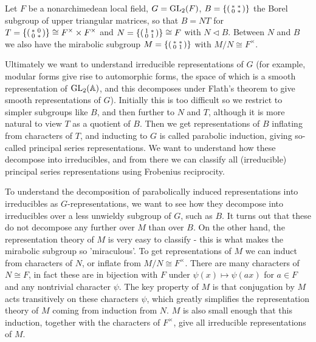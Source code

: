 

Let $F$ be a nonarchimedean local field, $G=\mathrm{GL}_2(F)$, $B=\{\begin{psmallmatrix} *&*\\0&*\end{psmallmatrix}\}$ the Borel subgroup of upper triangular matrices, so that $B=NT$ for $T=\{\begin{psmallmatrix}
    *&0\\0&*
\end{psmallmatrix}\} \cong F^\times \times F^\times$ and $N=\{\begin{psmallmatrix}
    1&*\\0&1
\end{psmallmatrix}\}\cong F$ with $N \lhd B$. Between $N$ and $B$ we also have the mirabolic subgroup $M=\{\begin{psmallmatrix}
    *&*\\0&1
\end{psmallmatrix}\}$ with $M/N \cong F^\times$.

Ultimately we want to understand irreducible representations of $G$ (for example, modular forms give rise to automorphic forms, the space of which is a smooth representation of $\mathrm{GL}_2(\mathbb{A})$, and this decomposes under Flath's theorem to give smooth representations of $G$). Initially this is too difficult so we restrict to simpler subgroups like $B$, and then further to $N$ and $T$, although it is more natural to view $T$ as a quotient of $B$. Then we get representations of $B$ inflating from characters of $T$, and inducting to $G$ is called parabolic induction, giving so-called principal series representations. We want to understand how these decompose into irreducibles, and from there we can classify all (irreducible) principal series representations using Frobenius reciprocity.

To understand the decomposition of parabolically induced representations into irreducibles as $G$-representations, we want to see how they decompose into irreducibles over a less unwieldy subgroup of $G$, such as $B$. It turns out that these do not decompose any further over $M$ than over $B$. On the other hand, the representation theory of $M$ is very easy to classify - this is what makes the mirabolic subgroup so 'miraculous'. To get representations of $M$ we can induct from characters of $N$, or inflate from $M/N\cong F^\times$. There are many characters of $N\cong F$, in fact these are in bijection with $F$ under $\psi(x) \mapsto \psi(ax)$ for $a \in F$ and any nontrivial character $\psi$. The key property of $M$ is that conjugation by $M$ acts transitively on these characters $\psi$, which greatly simplifies the representation theory of $M$ coming from induction from $N$. $M$ is also small enough that this induction, together with the characters of $F^\times$, give all irreducible representations of $M$.

